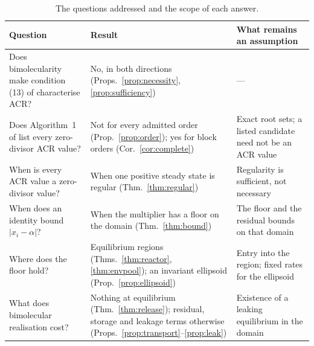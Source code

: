 \documentclass[11pt,a4paper]{article}
\theoremstyle{plain}
\theoremstyle{definition}
\theoremstyle{remark}
\begin{document}
\begin{table}[!htbp]
\centering\small
\begin{tabular}{@{}>{\raggedright\arraybackslash}p{}>{\raggedright\arraybackslash}p{}>{\raggedright\arraybackslash}p{}@{}}
\toprule
Question & Result & What remains an assumption\\
\midrule
Does bimolecularity make condition (13) of \cite{acr} characterise ACR? & No, in both directions (Props.~\ref{prop:necessity}, \ref{prop:sufficiency}) & ---\\
Does Algorithm~1 of \cite{acr} list every zero-divisor ACR value? & Not for every admitted order (Prop.~\ref{prop:order}); yes for block orders (Cor.~\ref{cor:complete}) & Exact root sets; a listed candidate need not be an ACR value\\
When is every ACR value a zero-divisor value? & When one positive steady state is regular (Thm.~\ref{thm:regular}) & Regularity is sufficient, not necessary\\
When does an identity bound $|x_i-\alpha|$? & When the multiplier has a floor on the domain (Thm.~\ref{thm:bound}) & The floor and the residual bounds on that domain\\
Where does the floor hold? & Equilibrium regions (Thms.~\ref{thm:reactor}, \ref{thm:envpool}); an invariant ellipsoid (Prop.~\ref{prop:ellipsoid}) & Entry into the region; fixed rates for the ellipsoid\\
What does bimolecular realisation cost? & Nothing at equilibrium (Thm.~\ref{thm:release}); residual, storage and leakage terms otherwise (Props.~\ref{prop:transport}--\ref{prop:leak}) & Existence of a leaking equilibrium in the domain\\
\bottomrule
\end{tabular}
\caption{The questions addressed and the scope of each answer.}\label{tab:map}
\end{table}
\end{document}
